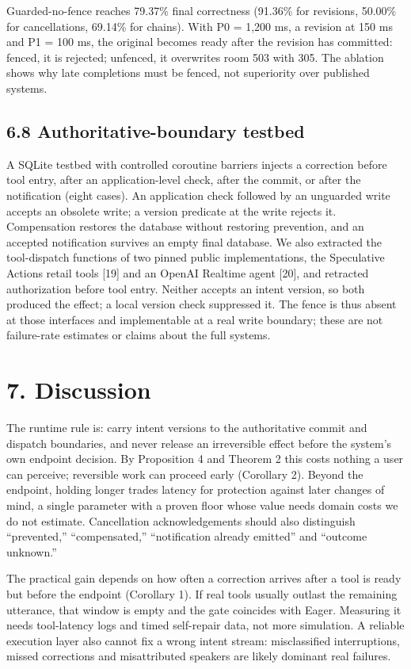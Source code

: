 \documentclass[11pt]{article}
\begin{document}
Guarded-no-fence reaches 79.37\% final correctness (91.36\% for revisions, 50.00\% for cancellations, 69.14\% for chains). With P0 = 1,200 ms, a revision at 150 ms and P1 = 100 ms, the original becomes ready after the revision has committed: fenced, it is rejected; unfenced, it overwrites room 503 with 305. The ablation shows why late completions must be fenced, not superiority over published systems.


\subsection*{6.8 Authoritative-boundary testbed}

A SQLite testbed with controlled coroutine barriers injects a correction before tool entry, after an application-level check, after the commit, or after the notification (eight cases). An application check followed by an unguarded write accepts an obsolete write; a version predicate at the write rejects it. Compensation restores the database without restoring prevention, and an accepted notification survives an empty final database. We also extracted the tool-dispatch functions of two pinned public implementations, the Speculative Actions retail tools [19] and an OpenAI Realtime agent [20], and retracted authorization before tool entry. Neither accepts an intent version, so both produced the effect; a local version check suppressed it. The fence is thus absent at those interfaces and implementable at a real write boundary; these are not failure-rate estimates or claims about the full systems.


\section*{7. Discussion}

The runtime rule is: carry intent versions to the authoritative commit and dispatch boundaries, and never release an irreversible effect before the system's own endpoint decision. By Proposition 4 and Theorem 2 this costs nothing a user can perceive; reversible work can proceed early (Corollary 2). Beyond the endpoint, holding longer trades latency for protection against later changes of mind, a single parameter with a proven floor whose value needs domain costs we do not estimate. Cancellation acknowledgements should also distinguish ``prevented,'' ``compensated,'' ``notification already emitted'' and ``outcome unknown.''


The practical gain depends on how often a correction arrives after a tool is ready but before the endpoint (Corollary 1). If real tools usually outlast the remaining utterance, that window is empty and the gate coincides with Eager. Measuring it needs tool-latency logs and timed self-repair data, not more simulation. A reliable execution layer also cannot fix a wrong intent stream: misclassified interruptions, missed corrections and misattributed speakers are likely dominant real failures.
\end{document}
